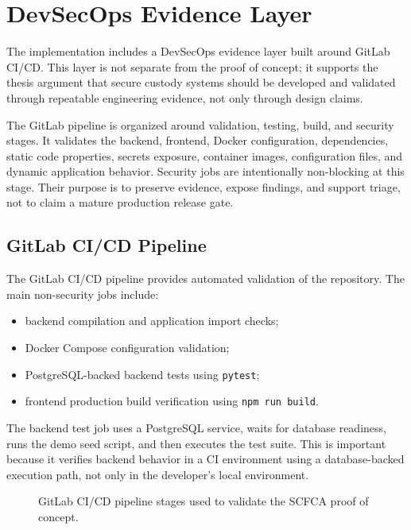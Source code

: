 \documentclass[12pt,a4paper]{report}
\begin{document}
\section{DevSecOps Evidence Layer}

The implementation includes a DevSecOps evidence layer built around GitLab CI/CD. This layer is not separate from the proof of concept; it supports the thesis argument that secure custody systems should be developed and validated through repeatable engineering evidence, not only through design claims.

The GitLab pipeline is organized around validation, testing, build, and security stages. It validates the backend, frontend, Docker configuration, dependencies, static code properties, secrets exposure, container images, configuration files, and dynamic application behavior. Security jobs are intentionally non-blocking at this stage. Their purpose is to preserve evidence, expose findings, and support triage, not to claim a mature production release gate.

\subsection{GitLab CI/CD Pipeline}

The GitLab CI/CD pipeline provides automated validation of the repository. The main non-security jobs include:

\begin{itemize}
    \item backend compilation and application import checks;
    \item Docker Compose configuration validation;
    \item PostgreSQL-backed backend tests using \texttt{pytest};
    \item frontend production build verification using \texttt{npm run build}.
\end{itemize}

The backend test job uses a PostgreSQL service, waits for database readiness, runs the demo seed script, and then executes the test suite. This is important because it verifies backend behavior in a CI environment using a database-backed execution path, not only in the developer's local environment.

\begin{figure}[htbp]
    \centering
    \caption{GitLab CI/CD pipeline stages used to validate the SCFCA proof of concept.}
    \label{fig:scfca-gitlab-pipeline-placeholder}
\end{figure}
\end{document}
